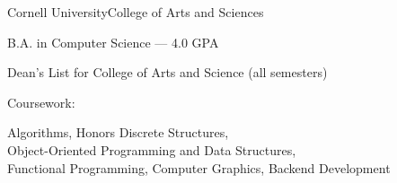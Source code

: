 \documentclass{resume}
\begin{document}
\begin{education}
    \begin{entryleft}{Cornell University}{College of Arts and Sciences}{}
        \begin{description}
            \item B.A. in Computer Science --- 4.0 GPA
            \item Dean's List for College of Arts and Science (all semesters)
            \begin{spacing}{0}
            \item Coursework:
            \end{spacing}
                    \begin{addmargin}[1em]{0em}
                        Algorithms,
                        Honors Discrete Structures,\\
                        Object-Oriented Programming and Data Structures,\\
                        Functional Programming,
                        Computer Graphics,
                        Backend Development
                    \end{addmargin}
        \end{description}
    \end{entryleft}
    \begin{entryright}
    \end{entryright}
\end{education}
\end{document}
